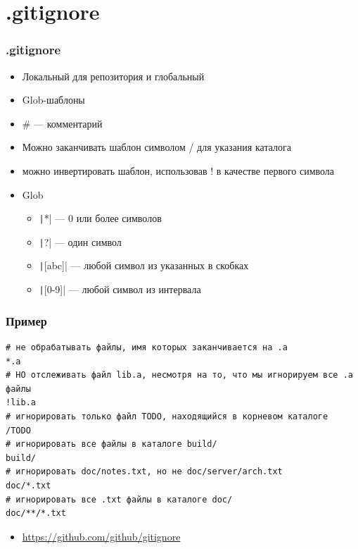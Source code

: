 \documentclass[xetex,mathserif,serif]{beamer}
\begin{document}
	\section{.gitignore}

	\begin{frame}
		\frametitle{.gitignore}
		\begin{itemize}
			\item Локальный для репозитория и глобальный
			\item Glob-шаблоны
			\item \# --- комментарий
			\item Можно заканчивать шаблон символом / для указания каталога
			\item можно инвертировать шаблон, использовав ! в качестве первого символа
			\item Glob
			\begin{itemize}
				\item \texttt|*| --- 0 или более символов
				\item \texttt|?| --- один символ
				\item \texttt|[abc]| --- любой символ из указанных в скобках
				\item \texttt|[0-9]| --- любой символ из интервала
			\end{itemize}
		\end{itemize}
	\end{frame}

	\begin{frame}[fragile]
		\frametitle{Пример}
		\begin{verbatim}
# не обрабатывать файлы, имя которых заканчивается на .a
*.a
# НО отслеживать файл lib.a, несмотря на то, что мы игнорируем все .a файлы 
!lib.a
# игнорировать только файл TODO, находящийся в корневом каталоге
/TODO
# игнорировать все файлы в каталоге build/
build/
# игнорировать doc/notes.txt, но не doc/server/arch.txt
doc/*.txt
# игнорировать все .txt файлы в каталоге doc/
doc/**/*.txt
		\end{verbatim}
		\begin{itemize}
			\item \url{https://github.com/github/gitignore}
		\end{itemize}
	\end{frame}
\end{document}
